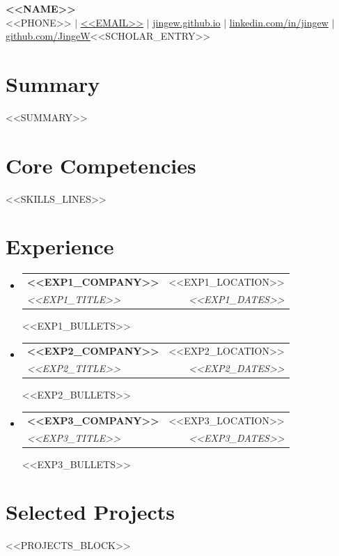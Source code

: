 \documentclass[letterpaper,11pt]{article}
\makeatletter
\newcommand{\resumeSubheading}[4]{
  \vspace{-2pt}\item
    \begin{tabular*}{0.97\textwidth}[t]{l@{\extracolsep{\fill}}r}
      \textbf{#1} & #2 \\
      \textit{\small#3} & \textit{\small #4} \\
    \end{tabular*}\vspace{-7pt}
}
\newcommand{\resumeSubHeadingListStart}{\begin{itemize}[leftmargin=0.15in, label={}]}
\newcommand{\resumeSubHeadingListEnd}{\end{itemize}}
\newcommand{\resumeItemListStart}{\begin{itemize}}
\newcommand{\resumeItemListEnd}{\end{itemize}\vspace{2pt}}
\makeatother
\begin{document}
\begin{center}
    \textbf{\Huge \scshape <<NAME>>} \\ \vspace{2pt}
    \small
    <<PHONE>> $|$
    \href{mailto:<<EMAIL>>}{\underline{<<EMAIL>>}} $|$
    \href{<<WEBSITE_URL>>}{\underline{jingew.github.io}} $|$
    \href{<<LINKEDIN_URL>>}{\underline{linkedin.com/in/jingew}} $|$
    \href{<<GITHUB_URL>>}{\underline{github.com/JingeW}}<<SCHOLAR_ENTRY>>
\end{center}

\section{Summary}
  \small{<<SUMMARY>>}

\section{Core Competencies}
 \begin{itemize}[leftmargin=0.15in, label={}]
    \small{\item{
     <<SKILLS_LINES>>
    }}
 \end{itemize}

\section{Experience}
  \resumeSubHeadingListStart

    \resumeSubheading
      {<<EXP1_COMPANY>>}{<<EXP1_LOCATION>>}
      {<<EXP1_TITLE>>}{<<EXP1_DATES>>}
      \resumeItemListStart
        <<EXP1_BULLETS>>
      \resumeItemListEnd

    \resumeSubheading
      {<<EXP2_COMPANY>>}{<<EXP2_LOCATION>>}
      {<<EXP2_TITLE>>}{<<EXP2_DATES>>}
      \resumeItemListStart
        <<EXP2_BULLETS>>
      \resumeItemListEnd

    \resumeSubheading
      {<<EXP3_COMPANY>>}{<<EXP3_LOCATION>>}
      {<<EXP3_TITLE>>}{<<EXP3_DATES>>}
      \resumeItemListStart
        <<EXP3_BULLETS>>
      \resumeItemListEnd

  \resumeSubHeadingListEnd

\section{Selected Projects}
    \resumeSubHeadingListStart
      <<PROJECTS_BLOCK>>
    \resumeSubHeadingListEnd
\end{document}
